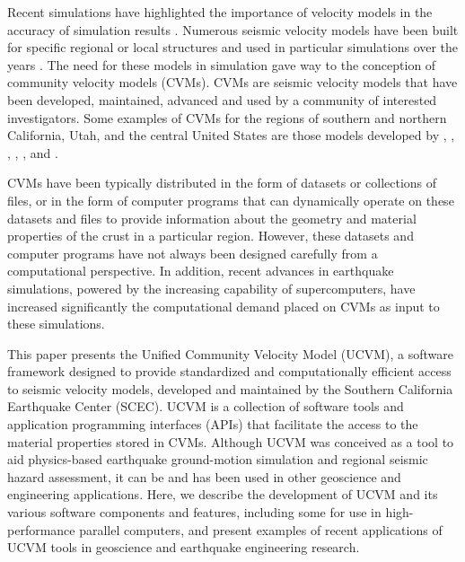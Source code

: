 Recent simulations have highlighted the importance of velocity models in the accuracy of simulation results \citep[e.g.,][]{Taborda_2014_BSSA}. Numerous seismic velocity models have been built for specific regional or local structures and used in particular simulations over the years \citep[e.g.,][]{Frankel_1992_BSSA, Brocher_2008_BSSA, Graves_2008_BSSA}. The need for these models in simulation gave way to the conception of community velocity models (CVMs). CVMs are seismic velocity models that have been developed, maintained, advanced and used by a community of interested investigators. Some examples of CVMs for the regions of southern and northern California, Utah, and the central United States are those models developed by \citet{Kohler_2003_BSSA}, \citet{Suss_2003_JGR}, \citet{Brocher_2006_Proc}, \citet{Magistrale_2006_Tech}, \citet{RamirezGuzman_2012_BSSA}, and \citet{Plesch_2011_SCEC}. 

CVMs have been typically distributed in the form of datasets or collections of files, or in the form of computer programs that can dynamically operate on these datasets and files to provide information about the geometry and material properties of the crust in a particular region. However, these datasets and computer programs have not always been designed carefully from a computational perspective. In addition, recent advances in earthquake simulations, powered by the increasing capability of supercomputers, have increased significantly the computational demand placed on CVMs as input to these simulations. 

This paper presents the Unified Community Velocity Model (UCVM), a software framework designed to provide standardized and computationally efficient access to seismic velocity models, developed and maintained by the Southern California Earthquake Center (SCEC). UCVM is a collection of software tools and application programming interfaces (APIs) that facilitate the access to the material properties stored in CVMs. Although UCVM was conceived as a tool to aid physics-based earthquake ground-motion simulation and regional seismic hazard assessment, it can be and has been used in other geoscience and engineering applications. Here, we describe the development of UCVM and its various software components and features, including some for use in high-performance parallel computers, and present examples of recent applications of UCVM tools in geoscience and earthquake engineering research.

